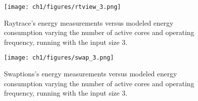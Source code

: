 

\begin{figure}[h]
	\centerline{\texttt{[image: ch1/figures/rtview\_3.png]}}
    \caption{Raytrace's energy measurements versus modeled energy consumption  varying the number of active cores and operating frequency, running with the input size 3.}
	\label{fig:rt_s3}
\end{figure}


\begin{figure}[h]
	\centerline{\texttt{[image: ch1/figures/swap\_3.png]}}
    \caption{Swaptions's energy measurements versus modeled energy consumption  varying the number of active cores and operating frequency, running with the input size 3.}
	\label{fig:swap_s3}
\end{figure}





